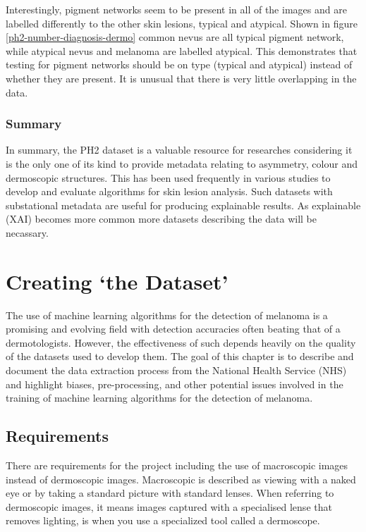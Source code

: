 Interestingly, pigment networks seem to be present in all of the images and are labelled differently to the other skin lesions, typical and atypical. Shown in figure \ref{ph2-number-diagnosis-dermo} common nevus are all typical pigment network, while atypical nevus and melanoma are labelled atypical. This demonstrates that testing for pigment networks should be on type (typical and atypical) instead of whether they are present. It is unusual that there is very little overlapping in the data.

\subsubsection{Summary}
In summary, the PH2 dataset is a valuable resource for researches considering it is the only one of its kind to provide metadata relating to asymmetry, colour and dermoscopic structures. This has been used frequently in various studies to develop and evaluate algorithms for skin lesion analysis. Such datasets with substational metadata are useful for producing explainable results. As explainable (XAI) becomes more common more datasets describing the data will be necassary.

\section{Creating `the Dataset'}
The use of machine learning algorithms for the detection of melanoma is a promising and evolving field with detection accuracies often beating that of a dermotologists\cite{Andre2017}. However, the effectiveness of such depends heavily on the quality of the datasets used to develop them\cite{Tae2019}. The goal of this chapter is to describe and document the data extraction process from the National Health Service (NHS) and highlight biases, pre-processing, and other potential issues involved in the training of machine learning algorithms for the detection of melanoma.

\subsection{Requirements}
There are requirements for the project including the use of macroscopic images instead of dermoscopic images. Macroscopic is described as viewing with a naked eye or by taking a standard picture with standard lenses. When referring to dermoscopic images, it means images captured with a specialised lense that removes lighting, is when you use a specialized tool called a dermoscope.

